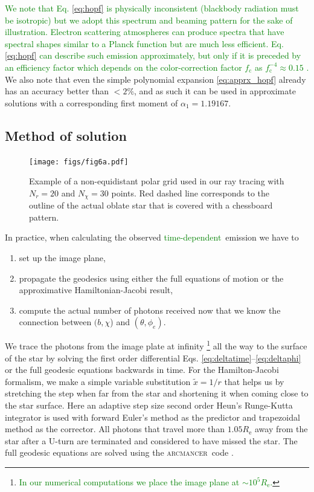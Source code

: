 \documentclass{aa}
\newcommand{\refe}[1]{\textcolor{green}{{#1}}}
\begin{document}
\refe{We note that Eq. \eqref{eq:hopf} is physically inconsistent (blackbody radiation must be isotropic) but we adopt this spectrum and beaming pattern for the sake of illustration. 
Electron scattering atmospheres can produce spectra that have spectral shapes similar to a Planck function but are much less efficient. 
Eq. \eqref{eq:hopf} can describe such emission approximately, but only if it is preceded by an efficiency factor which depends on the color-correction factor $f_{\mathrm{c}}$ as $f_{\mathrm{c}}^{-4} \approx 0.15$ \citep[see e.g.][]{SPW11, SPW12}.}
We also note that even the simple polynomial expansion \eqref{eq:apprx_hopf} already has an accuracy better than $<2\%$, and as such it can be used in approximate solutions with a corresponding first moment of $\alpha_1 = 1.19167$.




\subsection{Method of solution}\label{sect:num_methods}


\begin{figure}
\centering
\texttt{[image: figs/fig6a.pdf]}
\caption{\label{fig:grid}
Example of a non-equidistant polar grid used in our ray tracing with $N_r = 20$ and $N_{\chi} = 30$ points.
    Red dashed line corresponds to the outline of the actual oblate star that is covered with a chessboard pattern.
}
\end{figure}

In practice, when calculating the observed \refe{time-dependent} emission we have to 
\begin{enumerate}
    \item set up the image plane, 
    \item propagate the geodesics using either the full equations of motion or the approximative Hamiltonian-Jacobi result, 
    \item compute the actual number of photons received now that we know the connection between $(b,\chi$) and $(\theta, \phi_e)$.
\end{enumerate}

We trace the photons from the image plate at infinity%
\footnote{\refe{In our numerical computations we place the image plane at $\sim 10^5 R_{\mathrm{e}}$.}}
all the way to the surface of the star by solving the first order
differential Eqs. \eqref{eq:deltatime}--\eqref{eq:deltaphi} or the full geodesic equations backwards in time.  
For the Hamilton-Jacobi formalism, we make a simple variable substitution $\tilde{x} = 1/r$
 that helps us by stretching the step when
far from the star and shortening it when coming close to the star
surface.  Here an adaptive step size second order Heun's Runge-Kutta
integrator is used with forward Euler's method as
the predictor and trapezoidal method as the corrector.  
All photons that travel more than $1.05 R_{\mathrm{e}}$ away from the star after a U-turn are
terminated and considered to have missed the star.
The full geodesic equations are solved using the \textsc{arcmancer} code \citep[see][and the related equations therein]{PRJ16}.
\end{document}
